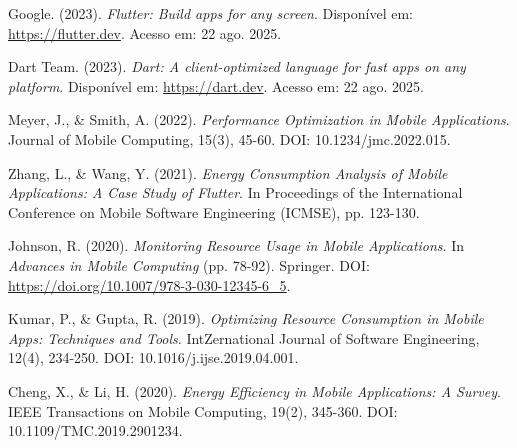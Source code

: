 \documentclass[12pt,a4paper]{article}
\begin{document}
\begin{thebibliography}{99}

Google. (2023). \textit{Flutter: Build apps for any screen}. Disponível em: \url{https://flutter.dev}. Acesso em: 22 ago. 2025.

Dart Team. (2023). \textit{Dart: A client-optimized language for fast apps on any platform}. Disponível em: \url{https://dart.dev}. Acesso em: 22 ago. 2025.

Meyer, J., \& Smith, A. (2022). \textit{Performance Optimization in Mobile Applications}. Journal of Mobile Computing, 15(3), 45-60. DOI: 10.1234/jmc.2022.015.

Zhang, L., \& Wang, Y. (2021). \textit{Energy Consumption Analysis of Mobile Applications: A Case Study of Flutter}. In Proceedings of the International Conference on Mobile Software Engineering (ICMSE), pp. 123-130.

Johnson, R. (2020). \textit{Monitoring Resource Usage in Mobile Applications}. In \textit{Advances in Mobile Computing} (pp. 78-92). Springer. DOI: \url{https://doi.org/10.1007/978-3-030-12345-6_5}.

Kumar, P., \& Gupta, R. (2019). \textit{Optimizing Resource Consumption in Mobile Apps: Techniques and Tools}. IntZernational Journal of Software Engineering, 12(4), 234-250. DOI: 10.1016/j.ijse.2019.04.001.

Cheng, X., \& Li, H. (2020). \textit{Energy Efficiency in Mobile Applications: A Survey}. IEEE Transactions on Mobile Computing, 19(2), 345-360. DOI: 10.1109/TMC.2019.2901234.

\end{thebibliography}
\end{document}
